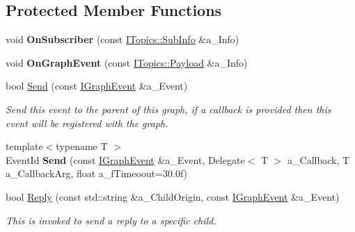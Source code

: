 \subsection*{Protected Member Functions}
\begin{DoxyCompactItemize}
\item 
\mbox{\label{class_graph_connector_adebe263327a7a0bc12564812c210bf9e}} 
void {\bfseries On\+Subscriber} (const \hyperlink{struct_i_topics_1_1_sub_info}{I\+Topics\+::\+Sub\+Info} \&a\+\_\+\+Info)
\item 
\mbox{\label{class_graph_connector_a1d7d502659b5e8e1438041a871eec76d}} 
void {\bfseries On\+Graph\+Event} (const \hyperlink{struct_i_topics_1_1_payload}{I\+Topics\+::\+Payload} \&a\+\_\+\+Info)
\item 
\mbox{\label{class_graph_connector_a2ab15072f8e104e332c297c0afd425f2}} 
bool \hyperlink{class_graph_connector_a2ab15072f8e104e332c297c0afd425f2}{Send} (const \hyperlink{struct_graph_connector_1_1_i_graph_event}{I\+Graph\+Event} \&a\+\_\+\+Event)
\begin{DoxyCompactList}\small\item\em Send this event to the parent of this graph, if a callback is provided then this event will be registered with the graph. \end{DoxyCompactList}\item 
\mbox{\label{class_graph_connector_ad45b604718166a5dcd2355959e69efe6}} 
{\footnotesize template$<$typename T $>$ }\\Event\+Id {\bfseries Send} (const \hyperlink{struct_graph_connector_1_1_i_graph_event}{I\+Graph\+Event} \&a\+\_\+\+Event, Delegate$<$ T $>$ a\+\_\+\+Callback, T a\+\_\+\+Callback\+Arg, float a\+\_\+f\+Timeoout=30.\+0f)
\item 
\mbox{\label{class_graph_connector_ac6bf3b038d903aaea6704e79482bfb73}} 
bool \hyperlink{class_graph_connector_ac6bf3b038d903aaea6704e79482bfb73}{Reply} (const std\+::string \&a\+\_\+\+Child\+Origin, const \hyperlink{struct_graph_connector_1_1_i_graph_event}{I\+Graph\+Event} \&a\+\_\+\+Event)
\begin{DoxyCompactList}\small\item\em This is invoked to send a reply to a specific child. \end{DoxyCompactList}\item 

\end{DoxyCompactItemize}
